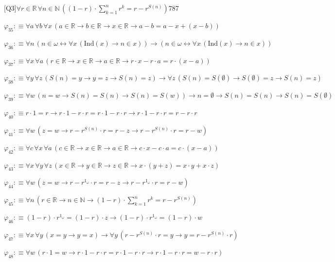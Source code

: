 \begin{fullproof}{[Q3]}{$\forall r \in \mathbb{R}\,\forall n \in \mathbb{N}\,((1 - r) \cdot {\textstyle\sum_{k=1}^{n} {{r}^{k}}} = r - {{r}^{S(n)}})$}{787}
\begin{abbrevlist}
\item $\varphi_{35} :\equiv \forall a\,\forall b\,\forall x\,(a \in \mathbb{R} \to b \in \mathbb{R} \to x \in \mathbb{R} \to a - b = a - x + (x - b))$
\item $\varphi_{36} :\equiv \forall n\,(n \in \omega \leftrightarrow \forall x\,(\mathrm{Ind}(x) \to n \in x)) \to (n \in \omega \leftrightarrow \forall x\,(\mathrm{Ind}(x) \to n \in x))$
\item $\varphi_{37} :\equiv \forall x\,\forall a\,(r \in \mathbb{R} \to x \in \mathbb{R} \to a \in \mathbb{R} \to r \cdot x - r \cdot a = r \cdot (x - a))$
\item $\varphi_{38} :\equiv \forall y\,\forall z\,(S(n) = y \to y = z \to S(n) = z) \to \forall z\,(S(n) = S(\emptyset) \to S(\emptyset) = z \to S(n) = z)$
\item $\varphi_{39} :\equiv \forall w\,(n = w \to S(n) = S(n) \to S(n) = S(w)) \to n = \emptyset \to S(n) = S(n) \to S(n) = S(\emptyset)$
\item $\varphi_{40} :\equiv r \cdot 1 = r \to r \cdot 1 - r \cdot r = r \cdot 1 - r \cdot r \to r \cdot 1 - r \cdot r = r - r \cdot r$
\item $\varphi_{41} :\equiv \forall w\,(z = w \to r - {{r}^{S(n)}} \cdot r = r - z \to r - {{r}^{S(n)}} \cdot r = r - w)$
\item $\varphi_{42} :\equiv \forall c\,\forall x\,\forall a\,(c \in \mathbb{R} \to x \in \mathbb{R} \to a \in \mathbb{R} \to c \cdot x - c \cdot a = c \cdot (x - a))$
\item $\varphi_{43} :\equiv \forall x\,\forall y\,\forall z\,(x \in \mathbb{R} \to y \in \mathbb{R} \to z \in \mathbb{R} \to x \cdot (y + z) = x \cdot y + x \cdot z)$
\item $\varphi_{44} :\equiv \forall w\,(z = w \to r - {{r}^{1_{\omega}}} \cdot r = r - z \to r - {{r}^{1_{\omega}}} \cdot r = r - w)$
\item $\varphi_{45} :\equiv \forall n\,(r \in \mathbb{R} \to n \in \mathbb{N} \to (1 - r) \cdot {\textstyle\sum_{k=1}^{n} {{r}^{k}}} = r - {{r}^{S(n)}})$
\item $\varphi_{46} :\equiv (1 - r) \cdot {{r}^{1_{\omega}}} = (1 - r) \cdot z \to (1 - r) \cdot {{r}^{1_{\omega}}} = (1 - r) \cdot w$
\item $\varphi_{47} :\equiv \forall x\,\forall y\,(x = y \to y = x) \to \forall y\,(r - {{r}^{S(n)}} \cdot r = y \to y = r - {{r}^{S(n)}} \cdot r)$
\item $\varphi_{48} :\equiv \forall w\,(r \cdot 1 = w \to r \cdot 1 - r \cdot r = r \cdot 1 - r \cdot r \to r \cdot 1 - r \cdot r = w - r \cdot r)$

\end{abbrevlist}
\end{fullproof}
